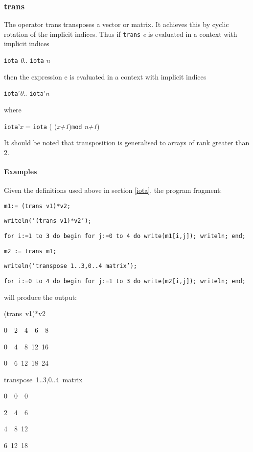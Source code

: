 {\subsubsection{trans}

The operator trans transposes a vector or matrix. It achieves
this by cyclic rotation of the implicit indices.
Thus if \texttt{trans} \emph{e} is evaluated in a context with implicit indices 

\texttt{iota} \emph{0}.. \texttt{iota} \emph{n }

then the expression e is evaluated in a context with implicit indices 

\texttt{iota}'\emph{0}.. \texttt{iota}'\emph{n} 

where 

\texttt{iota}'\emph{x} = \texttt{iota} ( (\emph{x+1})\texttt{mod} \emph{n+1})

It should be noted that transposition is generalised to arrays of rank greater
than 2.


\paragraph{Examples}

Given the definitions used above in section \ref{iota}, the program fragment:

\texttt{m1:= (trans v1){*}v2; }

\texttt{writeln('(trans v1){*}v2'); }

\texttt{for i:=1 to 3 do begin for j:=0 to 4 do write(m1{[}i,j{]}); writeln;
end; }

\texttt{m2 := trans m1; }

\texttt{writeln('transpose 1..3,0..4 matrix'); }

\texttt{for i:=0 to 4 do begin for j:=1 to 3 do write(m2{[}i,j{]}); writeln;
end;}

will produce the output:

\begin{lyxcode}
(trans~v1){*}v2~

0~~2~~4~~6~~8~

0~~4~~8~12~16~

0~~6~12~18~24~

transpose~1..3,0..4~matrix~

0~~0~~0~

2~~4~~6~

4~~8~12~

6~12~18~


\end{lyxcode}}
